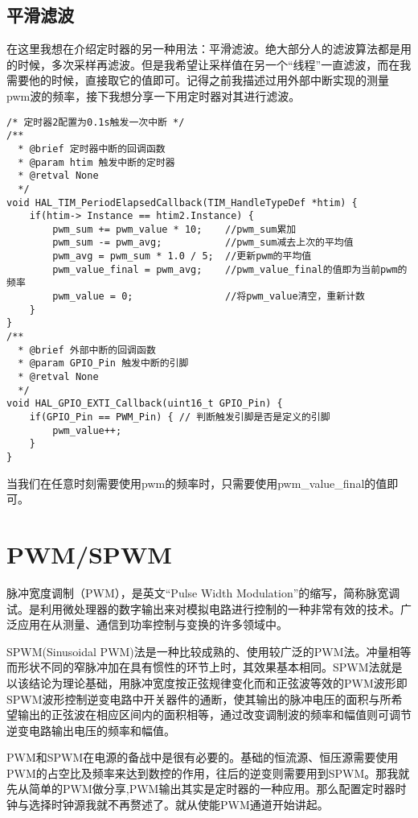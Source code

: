 \documentclass[cn,11pt]{elegantbook}
\begin{document}
\subsection{平滑滤波}

在这里我想在介绍定时器的另一种用法：平滑滤波。绝大部分人的滤波算法都是用的时候，多次采样再滤波。但是我希望让采样值在另一个“线程”一直滤波，而在我需要他的时候，直接取它的值即可。记得之前我描述过用外部中断实现的测量pwm波的频率，接下我想分享一下用定时器对其进行滤波。
\lstset{language=C}
\begin{lstlisting}
/* 定时器2配置为0.1s触发一次中断 */
/**
  * @brief 定时器中断的回调函数
  * @param htim 触发中断的定时器
  * @retval None
  */
void HAL_TIM_PeriodElapsedCallback(TIM_HandleTypeDef *htim) {
	if(htim-> Instance == htim2.Instance) {
		pwm_sum += pwm_value * 10;    //pwm_sum累加
		pwm_sum -= pwm_avg;           //pwm_sum减去上次的平均值
		pwm_avg = pwm_sum * 1.0 / 5;  //更新pwm的平均值
		pwm_value_final = pwm_avg;    //pwm_value_final的值即为当前pwm的频率
		pwm_value = 0;                //将pwm_value清空，重新计数
	}
}
/**
  * @brief 外部中断的回调函数
  * @param GPIO_Pin 触发中断的引脚
  * @retval None
  */
void HAL_GPIO_EXTI_Callback(uint16_t GPIO_Pin) {
	if(GPIO_Pin == PWM_Pin) { // 判断触发引脚是否是定义的引脚
		pwm_value++; 
	}
}
\end{lstlisting}
当我们在任意时刻需要使用pwm的频率时，只需要使用pwm\_value\_final的值即可。



\section{PWM/SPWM}

脉冲宽度调制（PWM），是英文“Pulse Width Modulation”的缩写，简称脉宽调试。是利用微处理器的数字输出来对模拟电路进行控制的一种非常有效的技术。广泛应用在从测量、通信到功率控制与变换的许多领域中。

SPWM(Sinusoidal PWM)法是一种比较成熟的、使用较广泛的PWM法。冲量相等而形状不同的窄脉冲加在具有惯性的环节上时，其效果基本相同。SPWM法就是以该结论为理论基础，用脉冲宽度按正弦规律变化而和正弦波等效的PWM波形即SPWM波形控制逆变电路中开关器件的通断，使其输出的脉冲电压的面积与所希望输出的正弦波在相应区间内的面积相等，通过改变调制波的频率和幅值则可调节逆变电路输出电压的频率和幅值。

PWM和SPWM在电源的备战中是很有必要的。基础的恒流源、恒压源需要使用PWM的占空比及频率来达到数控的作用，往后的逆变则需要用到SPWM。那我就先从简单的PWM做分享,PWM输出其实是定时器的一种应用。那么配置定时器时钟与选择时钟源我就不再赘述了。就从使能PWM通道开始讲起。
\end{document}
